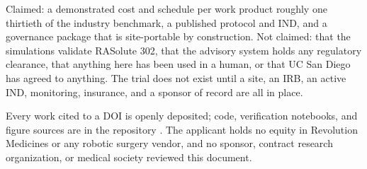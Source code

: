 \vspace{-0.2em}

Claimed: a demonstrated cost and schedule per work product roughly one
thirtieth of the industry benchmark, a published protocol and IND, and a
governance package that is site-portable by construction. Not claimed: that the simulations validate
RASolute 302, that the advisory system holds any regulatory clearance, that
anything here has been used in a human, or that UC San Diego has agreed to
anything. The trial does not exist until a site, an IRB, an active IND,
monitoring, insurance, and a sponsor of record are all in place.

\vspace{-0.2em}

Every work cited to a DOI is openly deposited; code, verification notebooks, and
figure sources are in the repository \cite{repo2026}. The applicant holds no
equity in Revolution Medicines or any robotic surgery vendor, and no sponsor,
contract research organization, or medical society reviewed this document.

\vspace{0.1em}
\apprule{0.4pt}
\vspace{-0.1em}

\vspace{-0.35em}
\begin{apprefs}


\end{apprefs}
